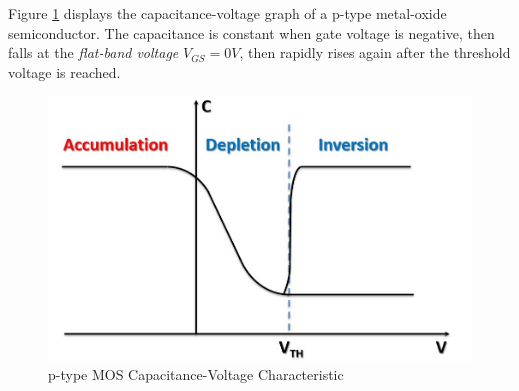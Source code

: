 \documentclass[nobib]{tufte-handout}
\begin{document}
Figure \ref{p-type MOS C-V} displays the 
capacitance-voltage graph of a p-type metal-oxide 
semiconductor. The capacitance is constant when 
gate voltage is negative, then falls at the \emph{flat-band voltage}
$V_{GS} = 0V$, then rapidly rises again after the threshold voltage 
is reached. 
\begin{figure}
    \caption{p-type MOS Capacitance-Voltage Characteristic}
    \label{p-type MOS C-V}
    \includegraphics{moscv.png}
\end{figure}
\end{document}
